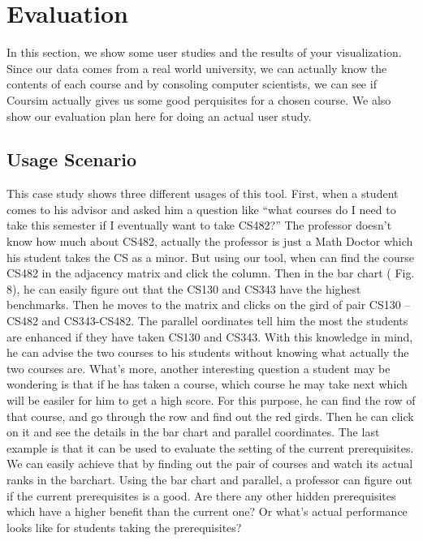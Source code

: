 \section{Evaluation} %
\label{sec:vis}

In this section, we show some user studies and the results of your visualization. Since our data comes from a real world university, we can actually know the contents of each course and by consoling computer scientists, we can see if Coursim actually gives us some good perquisites for a chosen course. We also show our evaluation plan here for doing an actual user study.

\subsection{Usage Scenario}
\label{sec:usage}

This case study shows three different usages of this tool. First, when a student comes to his advisor and asked him a question like “what courses do I need to take this semester if I eventually want to take CS482?” The professor doesn’t know how much about CS482, actually the professor is just a Math Doctor which his student takes the CS as a minor. But using our tool, when can find the course CS482 in the adjacency matrix and click the column. Then in the bar chart ( Fig. 8), he can easily figure out that the CS130 and CS343 have the highest benchmarks. Then he moves to the matrix and clicks on the gird of pair CS130 –CS482 and CS343-CS482. The parallel oordinates tell him the most the students are enhanced if they have taken CS130 and CS343. With this knowledge in mind, he can advise the two courses to his students without knowing what actually the two courses are. What's more, another interesting question a student may be wondering is that if he has taken a course, which course he may take next which will be easiler for him to get a high score. For this purpose, he can find the row of that course, and go through the row and find out the red girds. Then he can click on it and see the details in the bar chart and parallel coordinates. The last example is that it can be used to evaluate the setting of  the current prerequisites. We can easily achieve that by finding out the pair of courses and watch its actual ranks in the barchart. Using the bar chart and parallel, a professor can figure out if the current prerequisites is a good. Are there any other hidden prerequisites which have a higher benefit than the current one? Or what’s actual performance looks like for students taking the prerequisites?

